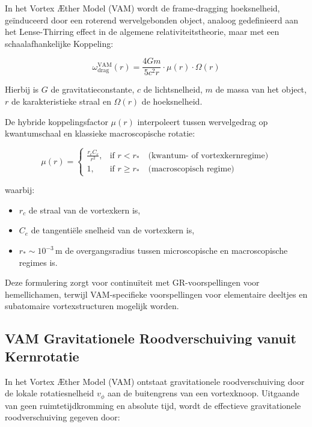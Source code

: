 In het Vortex Æther Model (VAM) wordt de frame-dragging hoeksnelheid, geïnduceerd door een roterend wervelgebonden object, analoog gedefinieerd aan het Lense-Thirring effect in de algemene relativiteitstheorie, maar met een schaalafhankelijke Koppeling:

\begin{equation}
    \omega_{\text{drag}}^{\text{VAM}}(r) =
    \frac{4 G m}{5 c^2 r} \cdot \mu(r) \cdot \Omega(r)
\end{equation}

Hierbij is \( G \) de gravitatieconstante, \( c \) de lichtsnelheid, \( m \) de massa van het object, \( r \) de karakteristieke straal en \( \Omega(r) \) de hoeksnelheid.

De hybride koppelingsfactor \( \mu(r) \) interpoleert tussen wervelgedrag op kwantumschaal en klassieke macroscopische rotatie:

\begin{equation}
    \mu(r) =
    \begin{cases}
        \displaystyle \frac{r_c C_e}{r^2}, & \text{if } r < r_\ast \quad \text{(kwantum- of vortexkernregime)} \\
        1, & \text{if } r \geq r_\ast \quad \text{(macroscopisch regime)}
    \end{cases}
\end{equation}

waarbij:
\begin{itemize}
    \item \( r_c \) de straal van de vortexkern is,
    \item \( C_e \) de tangentiële snelheid van de vortexkern is,
    \item \( r_\ast \sim 10^{-3} \, \text{m} \) de overgangsradius tussen microscopische en macroscopische regimes is.
\end{itemize}

Deze formulering zorgt voor continuïteit met GR-voorspellingen voor hemellichamen, terwijl VAM-specifieke voorspellingen voor elementaire deeltjes en subatomaire vortexstructuren mogelijk worden.


\subsection*{VAM Gravitationele Roodverschuiving vanuit Kernrotatie}

In het Vortex Æther Model (VAM) ontstaat gravitationele roodverschuiving door de lokale rotatiesnelheid \( v_\phi \) aan de buitengrens van een vortexknoop. Uitgaande van geen ruimtetijdkromming en absolute tijd, wordt de effectieve gravitationele roodverschuiving gegeven door:

